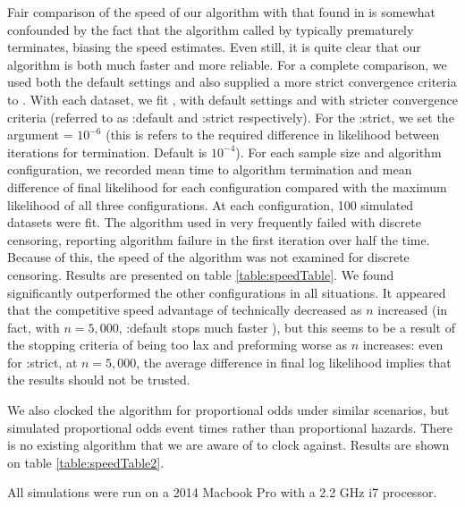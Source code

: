 \documentclass[article]{jss}
\begin{document}
	Fair comparison of the speed of our algorithm with that found in  is somewhat confounded by the fact that the algorithm called by  typically prematurely terminates, biasing the speed estimates. Even still, it is quite clear that our algorithm is both much faster and more reliable. For a complete comparison, we used both the default settings and also supplied a more strict convergence criteria to . With each dataset, we fit ,  with default settings and  with stricter convergence criteria (referred to as :default and :strict respectively). For the :strict, we set the argument  = $10^{-6}$ (this is refers to the required difference in likelihood between iterations for termination. Default is $10^{-4}$). For each sample size and algorithm configuration, we recorded mean time to algorithm termination and mean difference of final likelihood for each configuration compared with the maximum likelihood of all three configurations. At each configuration, 100 simulated datasets were fit. The algorithm used in  very frequently failed with discrete censoring, reporting algorithm failure in the first iteration over half the time. Because of this, the speed of the  algorithm was not examined for discrete censoring.  Results are presented on table \ref{table:speedTable}.  We found  significantly outperformed the other configurations in all situations. It appeared that the competitive speed advantage of  technically decreased as $n$ increased (in fact, with $n = 5,000$, :default stops much faster ), but this seems to be a result of the stopping criteria of  being too lax and preforming worse as $n$ increases: even for :strict, at $n = 5,000$, the average difference in final log likelihood implies that the results should not be trusted. 
	
	We also clocked the algorithm for proportional odds under similar scenarios, but simulated proportional odds event times rather than proportional hazards. There is no existing algorithm that we are aware of to clock against. Results are shown on table \ref{table:speedTable2}.
	
	All simulations were run on a 2014 Macbook Pro with a 2.2 GHz i7 processor. 
	
	
	
\end{document}
